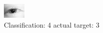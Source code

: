 \begin{figure}[h!]
\begin{center}
\includegraphics[width=0.60\columnwidth]{figures/ID95_class_4_target_3.png}
\end{center}
\caption{ Classification: 4 actual target: 3}
\label{fig:ID95_class_4_target_3}
\end{figure}
